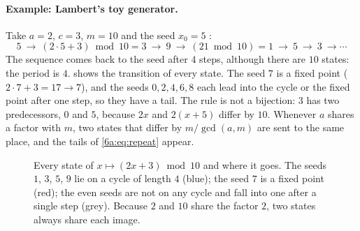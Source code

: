 \paragraph{Example: Lambert's toy generator.}
Take $a=2$, $c=3$, $m=10$ and the seed $x_0=5$ :
\[
  5\ \to\ (2\cdot5+3)\bmod10=3\ \to\ 9\ \to\ (21\bmod 10)=1\ \to\ 5\ \to\ 3\ \to\cdots
\]
The sequence comes back to the seed after $4$ steps, although there are $10$
states: the period is $4$. 
shows the transition of every state. The seed $7$ is a fixed point
($2\cdot7+3=17\to7$), and the seeds $0,2,4,6,8$ each lead into the cycle or the
fixed point after one step, so they have a tail. The rule is not a bijection:
$3$ has two predecessors, $0$ and $5$, because $2x$ and $2(x+5)$ differ by $10$.
Whenever $a$ shares a factor with $m$, two states that differ by $m/\gcd(a,m)$ are
sent to the same place, and the tails of \cref{6a:eq:repeat} appear.

\begin{figure}[htbp]
\centering
{}
\caption{Every state of $x\mapsto(2x+3)\bmod 10$ and where it goes. The seeds $1$,
$3$, $5$, $9$ lie on a cycle of length $4$ (blue); the seed $7$ is a fixed point
(red); the even seeds are not on any cycle and fall into one after a single step
(grey). Because $2$ and $10$ share the factor $2$, two states always share each
image.}
\label{6a:fig:functional-graph}
\end{figure}

